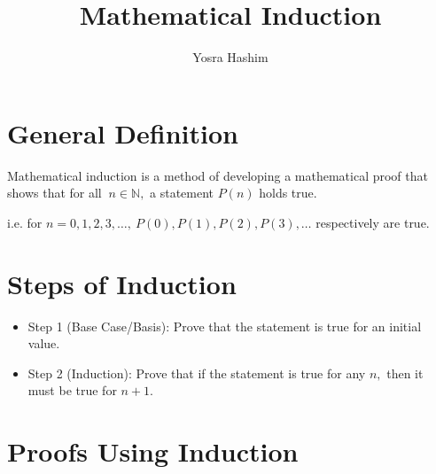 \documentclass[11pt]{article}
\newtheorem*{General Definition}{General Definition}
\theoremstyle{definition}
\begin{document}
\title{Mathematical Induction}
\author{Yosra Hashim}
\date{}
\maketitle

\section*{General Definition}
Mathematical induction is a method of developing a mathematical proof that shows that for all $\ n \in \mathbb{N},$ a statement $P(n)$ holds true.
 
i.e. for $n= 0,1,2,3,\dots,\  P(0), P(1), P(2),P(3),\dots$ respectively are true.
\section*{Steps of Induction}
\begin{itemize}
	\item Step 1 (Base Case/Basis): 
 Prove that the statement is true for an initial value.
\item Step 2 (Induction):
Prove that if the statement is true for any $n,$ then it must be true for $n+1.$
\end{itemize}
\section*{Proofs Using Induction}
\end{document}

